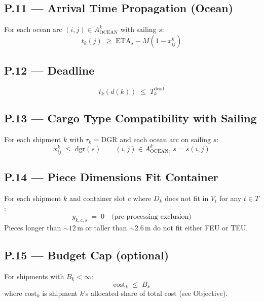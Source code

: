 \documentclass[11pt,a4paper]{article}
\theoremstyle{definition}
\begin{document}
\subsection*{P.11 — Arrival Time Propagation (Ocean)}

For each ocean arc $(i,j) \in A^k_{\text{OCEAN}}$ with sailing $s$:
\begin{equation}
  t_k(j) \;\geq\; \text{ETA}_s - M (1 - x_{ij}^k)
  \label{eq:lcl-P11}
\end{equation}

\subsection*{P.12 — Deadline}

\begin{equation}
  t_k(d(k)) \;\leq\; T_k^{\text{dead}}
  \label{eq:lcl-P12}
\end{equation}

\subsection*{P.13 — Cargo Type Compatibility with Sailing}

For each shipment $k$ with $\tau_k = \text{DGR}$ and each ocean arc on sailing $s$:
\begin{equation}
  x_{ij}^k \;\leq\; \text{dgr}(s) \qquad (i,j) \in A^k_{\text{OCEAN}}, \, s = s(i,j)
  \label{eq:lcl-P13}
\end{equation}

\subsection*{P.14 — Piece Dimensions Fit Container}

For each shipment $k$ and container slot $c$ where $D_k$ does not fit in $V_t$ for any $t \in T$:
\begin{equation}
  y_{k,c,s} \;=\; 0 \quad \text{(pre-processing exclusion)}
  \label{eq:lcl-P14}
\end{equation}
Pieces longer than $\sim 12$\,m or taller than $\sim 2.6$\,m do not fit either FEU or TEU.

\subsection*{P.15 — Budget Cap (optional)}

For shipments with $B_k < \infty$:
\begin{equation}
  \text{cost}_k \;\leq\; B_k
  \label{eq:lcl-P15}
\end{equation}
where $\text{cost}_k$ is shipment $k$'s allocated share of total cost (see Objective).
\end{document}
